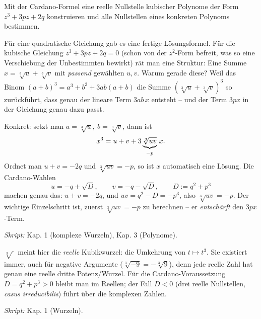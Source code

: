 

Mit der Cardano-Formel eine reelle Nullstelle kubischer Polynome der Form
$z^3+3pz+2q$ konstruieren und alle Nullstellen eines konkreten Polynoms
bestimmen.

\begin{werkzeugkasten}
Für eine quadratische Gleichung gab es eine fertige Lösungsformel. Für die
kubische Gleichung $z^3+3pz+2q=0$ (schon von der $z^2$-Form befreit, was
so eine Verschiebung der Unbestimmten bewirkt) rät man eine Struktur: Eine
Summe $x=\sqrt[3]{u}+\sqrt[3]{v}$ mit \emph{passend} gewählten $u,v$.
Warum gerade diese? Weil das Binom $(a+b)^3=a^3+b^3+3ab(a+b)$ die Summe
$(\sqrt[3]{u}+\sqrt[3]{v})^3$ so zurückführt, dass genau der lineare Term
$3ab\,x$ entsteht -- und der Term $3px$ in der Gleichung genau dazu passt.

Konkret: setzt man $a=\sqrt[3]{u},\ b=\sqrt[3]{v}$, dann ist
\begin{equation*}
  x^3=u+v+3\underbrace{\sqrt[3]{uv}}_{\mathstrut -p}\,x .
\end{equation*}
Ordnet man $u+v=-2q$ und $\sqrt[3]{uv}=-p$, so ist $x$ automatisch eine
Lösung. Die Cardano-Wahlen
\begin{equation*}
  u=-q+\sqrt{D},\qquad v=-q-\sqrt{D},\qquad D:=q^2+p^3
\end{equation*}
machen genau das: $u+v=-2q$, und $uv=q^2-D=-p^3$, also
$\sqrt[3]{uv}=-p$. Der wichtige Einzelschritt ist, zuerst
$\sqrt[3]{uv}=-p$ zu berechnen -- er \emph{entschärft} den $3px$-Term.

\textit{Skript:} Kap. 1 (komplexe Wurzeln), Kap. 3 (Polynome).
\end{werkzeugkasten}

\begin{werkzeugkasten}
\emph{$\sqrt[3]{\cdot}$} meint hier die \emph{reelle} Kubikwurzel: die
Umkehrung von $t\mapsto t^3$. Sie existiert immer, auch für negative
Argumente ($\sqrt[3]{-9}=-\sqrt[3]{9}$), denn jede reelle Zahl hat genau
eine reelle dritte Potenz/Wurzel. Für die Cardano-Voraussetzung
$D=q^2+p^3>0$ bleibt man im Reellen; der Fall $D<0$ (drei reelle
Nullstellen, \emph{casus irreducibilis}) führt über die komplexen Zahlen.

\textit{Skript:} Kap. 1 (Wurzeln).
\end{werkzeugkasten}

